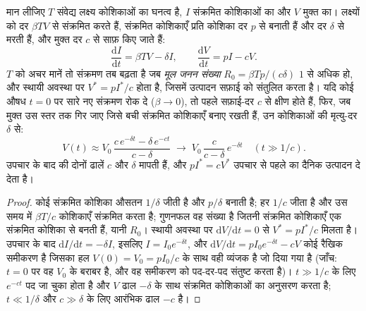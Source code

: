 \begin{theorem}\label{thm:b3:virology:dynamics}
मान लीजिए $T$ संवेद्य लक्ष्य कोशिकाओं का घनत्व है, $I$ संक्रमित
कोशिकाओं का और $V$ मुक्त  का।  लक्ष्यों को दर $\beta TV$
से संक्रमित करते हैं, संक्रमित कोशिकाएँ प्रति कोशिका दर $p$ से
 बनाती हैं और दर $\delta$ से मरती हैं, और मुक्त  दर
$c$ से साफ़ किए जाते हैं:
\[
\frac{\mathrm{d}I}{\mathrm{d}t} = \beta TV - \delta I, \qquad
\frac{\mathrm{d}V}{\mathrm{d}t} = pI - cV .
\]
$T$ को अचर मानें तो संक्रमण तब बढ़ता है जब \emph{मूल
जनन संख्या} $R_{0} = \beta Tp/(c\delta)$ $1$ से अधिक हो, और स्थायी
अवस्था पर $V^{*} = p I^{*}/c$ होता है, जिसमें उत्पादन सफ़ाई को संतुलित
करता है। यदि कोई औषध $t = 0$ पर सारे नए संक्रमण रोक दे ($\beta \to 0$),
तो  पहले सफ़ाई-दर $c$ से क्षीण होते हैं, फिर, जब मुक्त 
उस स्तर तक गिर जाए जिसे बची संक्रमित कोशिकाएँ बनाए रखती हैं, उन
कोशिकाओं की मृत्यु-दर $\delta$ से:
\[
V(t) \approx V_{0}\,\frac{c\,e^{-\delta t} - \delta\,e^{-ct}}{c - \delta}
\;\longrightarrow\; V_{0}\,\frac{c}{c-\delta}\,e^{-\delta t}
\quad (t \gg 1/c).
\]
उपचार के बाद  की दोनों ढालें $c$ और
$\delta$ मापती हैं, और $pI^{*} = cV^{*}$ उपचार से पहले  का
दैनिक उत्पादन दे देता है।
\end{theorem}
\begin{proof}
कोई संक्रमित कोशिका औसतन $1/\delta$ जीती है और $p/\delta$
 बनाती है; हर  $1/c$ जीता है और उस समय में $\beta T/c$
कोशिकाएँ संक्रमित करता है; गुणनफल वह संख्या है जितनी संक्रमित कोशिकाएँ
एक संक्रमित कोशिका से बनती हैं, यानी $R_{0}$। स्थायी अवस्था पर
$\mathrm{d}V/\mathrm{d}t = 0$ से $V^{*} = pI^{*}/c$ मिलता है। उपचार के
बाद $\mathrm{d}I/\mathrm{d}t =
-\delta I$, इसलिए $I = I_{0}e^{-\delta t}$, और $\mathrm{d}V/\mathrm{d}t =
pI_{0}e^{-\delta t} - cV$ कोई रैखिक समीकरण है जिसका हल
$V(0) = V_{0} = pI_{0}/c$ के साथ वही व्यंजक है जो दिया गया है (जाँच: $t = 0$ पर
वह $V_{0}$ के बराबर है, और वह समीकरण को पद-दर-पद संतुष्ट करता है)। $t
\gg 1/c$ के लिए $e^{-ct}$ पद जा चुका होता है और $V$ ढाल $-\delta$ के
साथ संक्रमित कोशिकाओं का अनुसरण करता है; $t \ll 1/\delta$ और $c \gg \delta$
के लिए आरंभिक ढाल $-c$ है।
\end{proof}

